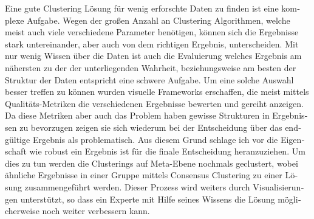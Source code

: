 \iffalse  \fi

\begin{otherlanguage}{ngerman}

Eine gute Clustering Lösung für wenig erforschte Daten zu finden ist eine komplexe Aufgabe. Wegen der großen Anzahl an Clustering Algorithmen, welche meist auch viele verschiedene Parameter benötigen, können sich die Ergebnisse stark untereinander, aber auch von dem richtigen Ergebnis, unterscheiden. Mit nur wenig Wissen über die Daten ist auch die Evaluierung welches Ergebnis am nähersten zu der der unterliegenden Wahrheit, beziehungsweise am besten der Struktur der Daten entspricht eine schwere Aufgabe.  Um eine solche Auswahl besser treffen zu können wurden visuelle Frameworks erschaffen, die meist mittels Qualitäts-Metriken die verschiedenen Ergebnisse bewerten und gereiht anzeigen. Da diese Metriken aber auch das Problem haben gewisse Strukturen in Ergebnissen zu bevorzugen zeigen sie sich wiederum bei der Entscheidung über das endgültige Ergebnis als problematisch. Aus diesem Grund schlage ich vor die Eigenschaft wie robust ein Ergebnis ist für die finale Entscheidung heranzuziehen. Um dies zu tun werden die Clusterings auf Meta-Ebene nochmals geclustert, wobei ähnliche Ergebnisse in einer Gruppe mittels Consensus Clustering zu einer Lösung zusammengeführt werden. Dieser Prozess wird weiters durch Visualisierungen unterstützt, so dass ein Experte mit Hilfe seines Wissens die Lösung möglicherweise noch weiter verbessern kann.

\end{otherlanguage}
